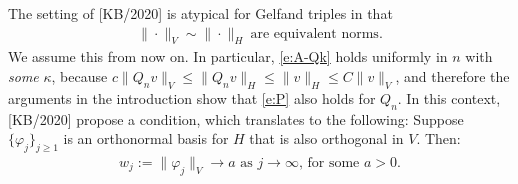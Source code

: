 \documentclass[12pt]{article}
\newcommand{\norm}[2]{\|#1\|_{#2}}
\newcommand{\from}{\colon}
\begin{document}
	The setting of [KB/2020]
	is atypical for Gelfand triples
	in that 
	\begin{align}
		\norm{\cdot}{V} \sim \norm{\cdot}{H}
		\ 
		\text{are equivalent norms}
		.
	\end{align}
	We assume this from now on.
	In particular,
	\eqref{e:A-Qk}
	holds uniformly in $n$ with \emph{some} $\kappa$,
	because
	$c \norm{Q_n v}{V} \leq \norm{Q_n v}{H} \leq \norm{v}{H} \leq C \norm{v}{V}$,
	and therefore the arguments in the introduction show that
	\eqref{e:P} also holds for $Q_n$.
	In this context, [KB/2020]
	propose a condition,
	which translates to the following:
	Suppose $\{ \varphi_j \}_{j \geq 1}$
	is an orthonormal basis for $H$
	that is also orthogonal in $V$.
	Then:
	\begin{align}
		\label{e:III}
		\text{
			$w_j := \norm{\varphi_j}{V} \to a$ as $j \to \infty$,
			for some $a > 0$.
		}
	\end{align}

	
\end{document}
